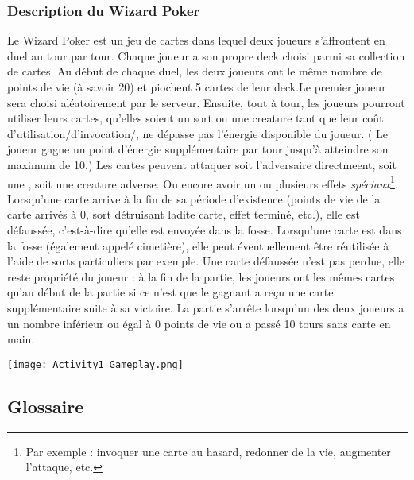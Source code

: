 \documentclass{article}
\begin{document}
		\subsubsection{Description du Wizard Poker}
			Le Wizard Poker est un jeu de cartes dans lequel deux joueurs s'affrontent en duel au tour par tour. Chaque joueur a son propre deck
			choisi parmi sa collection de cartes. Au début de chaque duel, les deux joueurs ont le même nombre de points de vie (à savoir 20) et piochent 5
			cartes de leur deck.Le premier joueur sera choisi aléatoirement par le serveur. Ensuite, tout à tour, les joueurs pourront utiliser leurs cartes, qu'elles soient un sort ou une
			creature tant que leur coût d'utilisation/d'invocation/, ne dépasse pas l'énergie disponible du joueur. ( Le joueur gagne un point d'énergie supplémentaire par tour jusqu'à atteindre son maximum de 10.)
			Les cartes peuvent attaquer soit l'adversaire directmeent, soit une , soit une creature adverse. Ou encore avoir un ou plusieurs effets \textit{spéciaux}\footnote{Par exemple : invoquer une carte au hasard, redonner de la vie, augmenter l'attaque, etc.}. Lorsqu'une carte
			arrive à la fin de sa période d'existence (points de vie de la carte arrivés à 0, sort détruisant ladite carte, effet terminé, etc.), elle est
			défaussée, c'est-à-dire qu'elle est envoyée dans la fosse.
			Lorsqu'une carte est dans la fosse (également appelé cimetière), elle
			peut éventuellement être réutilisée à l'aide de sorts particuliers par exemple. Une carte défaussée n'est pas perdue, elle reste propriété du joueur :
			à la fin de la partie, les joueurs ont les mêmes cartes qu'au début de la partie si ce n'est que le gagnant a reçu une carte supplémentaire
			suite à sa victoire. La partie s'arrête lorsqu'un des deux joueurs a un nombre inférieur ou égal à 0 points de vie ou a passé 10 tours sans carte en main.

			\begin{center}\texttt{[image: Activity1\_Gameplay.png]}\end{center}

	\subsection{Glossaire}  %
		\printglossary[type=glossary, style=noIndex, title=]
\end{document}
